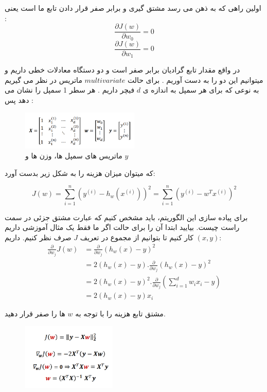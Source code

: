 \documentclass[12pt]{article}
\begin{document}
اولین راهی که به ذهن می رسد مشتق گیری و برابر صفر قرار دادن تابع ما است یعنی : 
$$\frac{\partial J(w)}{\partial w_0} 
 = 0 $$
 $$\frac{\partial J(w)}{\partial w_1} 
 = 0 $$

  در واقع مقدار تابع گرادیان برابر صفر است و دو دستگاه معادلات خطی داریم و میتوانیم این دو را به دست آوریم .
 برای حالت 
 $multivariate$
 ماتریس در نظر می گیریم به نوعی که برای هر سمپل به اندازه ی 
 $d$
 فیچر داریم .
 هر سطر 1 سمپل را نشان می دهد 
 پس :

\begin{figure}[htbp]
  \centering
  \includegraphics[width=0.50\textwidth]{etc/Images/Fig5.png} 
  \caption{ماتریس های سمپل ها، وزن ها و $y$}
  \label{fig5}
\end{figure}

که میتوان میزان هزینه را به شکل زیر بدست آورد:

\[
J(w)=\sum_{i=1}^{n}(y^{(i)}-h_{w}(x^{(i)}))^2=\sum_{i=1}^{n}(y^{(i)}-w^{T}x^{(i)})^2
\]

برای پیاده سازی این الگوریتم، باید مشخص کنیم که عبارت مشتق جزئی در سمت راست چیست. بیایید ابتدا آن را برای حالت اگر ما فقط یک مثال آموزشی داریم $(x, y)$ کار کنیم تا بتوانیم از مجموع در تعریف $J$ صرف نظر کنیم. داریم:
\begin{align*}
\frac{\partial}{\partial w_j}J(w) &= \frac{\partial}{\partial w_j} (h_w(x) - y)^2 \\
&= 2 (h_w(x) - y) . \frac{\partial}{\partial w_j}(h_w(x) - y)^2 \\
&= 2 (h_w(x) - y)^2  . \frac{\partial}{\partial w_j} \left(\sum_{i=1}^{d} w_i x_i - y \right)
\\
&=2 (h_w(x) - y) x_i
\end{align*}

مشتق تابع هزینه را با توجه به $w$ ها را صفر قرار دهید.
\begin{figure}[htbp]
  \centering
  \includegraphics[width=0.4\textwidth]{etc/Images/Fig6.png} 
  \label{fig6}
\end{figure}
\end{document}
